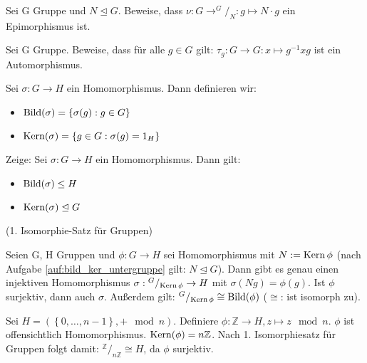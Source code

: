 \documentclass[10pt]{scrbook}
\begin{document}
\begin{Auf}
Sei G Gruppe und $N\trianglelefteq G$. Beweise, dass $\nu: G\rightarrow ^G/_N: g\mapsto N\cdot g$ ein Epimorphismus ist.
\end{Auf}

\begin{Auf}
Sei G Gruppe. Beweise, dass für alle $g\in G$ gilt: $\tau_g: G \rightarrow G: x\mapsto g^{-1} x g$ ist ein Automorphismus.
\end{Auf}

\begin{Def}
Sei $\sigma: G\rightarrow H$ ein Homomorphismus. Dann definieren wir:
\begin{itemize}
	\item $\operatorname{Bild}(\sigma)=\left\{\sigma(g): g\in G\right\}$
	\item $\operatorname{Kern}(\sigma)=\left\{g\in G: \sigma(g)=1_H\right\}$
\end{itemize}
\end{Def}

\begin{Auf}\label{auf:bild_ker_untergruppe}
Zeige: Sei $\sigma: G\rightarrow H$ ein Homomorphismus. Dann gilt:
\begin{itemize}
	\item $\operatorname{Bild} (\sigma)\leq H$
	\item $\operatorname{Kern} (\sigma)\trianglelefteq G$
\end{itemize}
\end{Auf}

\begin{Sa}
(1. Isomorphie-Satz für Gruppen)

Seien G, H Gruppen und $\phi: G \rightarrow H$ sei Homomorphismus mit $N:=\operatorname{Kern} \phi$ (nach Aufgabe \ref{auf:bild_ker_untergruppe} gilt: $N\trianglelefteq G$). Dann gibt es genau einen injektiven Homomorphismus $\sigma: {}^G/_{\operatorname{Kern} \phi} \rightarrow H$ mit $\sigma(N g)=\phi(g)$. Ist $\phi$ surjektiv, dann auch $\sigma$. Außerdem gilt: $^G/_{\operatorname{Kern} \phi}\cong \operatorname{Bild}(\phi)$ ($\cong$: ist isomorph zu).
\end{Sa}

\begin{Bsp}
Sei $H=\left(\left\{0, \ldots, n-1 \right\}, + \mod n\right)$. Definiere $\phi: \mathbb{Z}\rightarrow H, z\mapsto z \mod n$. $\phi$ ist offensichtlich Homomorphismus. $\operatorname{Kern} (\phi)=n\mathbb{Z}$. Nach 1. Isomorphiesatz für Gruppen folgt damit: $^\mathbb{Z}/_{n \mathbb{Z}}\cong H$, da $\phi$ surjektiv.
\end{Bsp}
\end{document}
